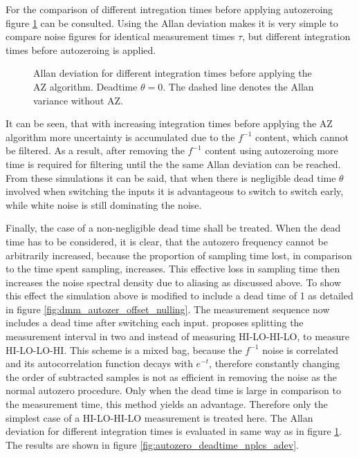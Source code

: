 For the comparison of different intregation times before applying autozeroing figure \ref{fig:autozero_nplcs_adev} can be consulted. Using the Allan deviation makes it is very simple to compare noise figures for identical measurement times $\tau$, but different integration times before autozeroing is applied.

\begin{figure}[ht]
    \centering
    
    \caption{Allan deviation for different integration times before applying the AZ algorithm. Deadtime $\theta = 0$. The dashed line denotes the Allan variance without AZ.}
    \label{fig:autozero_nplcs_adev}
\end{figure}

It can be seen, that with increasing integration times before applying the AZ algorithm more uncertainty is accumulated due to the $f^{-1}$ content, which cannot be filtered. As a result, after removing the $f^{-1}$ content using autozeroing more time is required for filtering until the the same Allan deviation can be reached. From these simulations it can be said, that when there is negligible dead time $\theta$ involved when switching the inputs it is advantageous to switch to switch early, while white noise is still dominating the noise.

Finally, the case of a non-negligible dead time shall be treated. When the dead time has to be considered, it is clear, that the autozero frequency cannot be arbitrarily increased, because the proportion of sampling time lost, in comparison to the time spent sampling, increases. This effective loss in sampling time then increases the noise spectral density due to aliasing as discussed above. To show this effect the simulation above is modified to include a dead time of \qty{1}{\plc} as detailed in figure \ref{fig:dmm_autozer_offset_nulling}. The measurement sequence now includes a dead time after switching each input. \citeauthor{autozero_with_dead_time} proposes \cite{autozero_with_dead_time} splitting the measurement interval in two and instead of measuring HI-LO-HI-LO, to measure HI-LO-LO-HI. This scheme is a mixed bag, because the $f^{-1}$ noise is correlated and its autocorrelation function decays with $e^{-t}$, therefore constantly changing the order of subtracted samples is not as efficient in removing the noise as the normal autozero procedure. Only when the dead time is large in comparison to the measurement time, this method yields an advantage. Therefore only the simplest case of a HI-LO-HI-LO measurement is treated here. The Allan deviation for different integration times is evaluated in same way as in figure \ref{fig:autozero_nplcs_adev}. The results are shown in figure \ref{fig:autozero_deadtime_nplcs_adev}.


